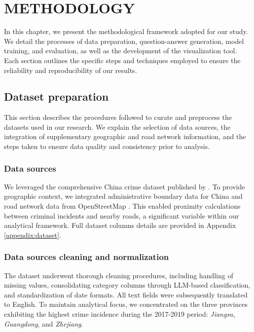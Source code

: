 \chapter{ METHODOLOGY}

\noindent
In this chapter, we present the methodological framework adopted for our study. We detail the processes of data preparation, question-answer generation, model training, and evaluation, as well as the development of the visualization tool. Each section outlines the specific steps and techniques employed to ensure the reliability and reproducibility of our results.

\section{Dataset preparation}

\noindent
This section describes the procedures followed to curate and preprocess the datasets used in our research. We explain the selection of data sources, the integration of supplementary geographic and road network information, and the steps taken to ensure data quality and consistency prior to analysis.

\subsection{Data sources}

We leveraged the comprehensive China crime dataset published by \cite{Zhang2025CrimeDatasetChina}. To provide geographic context, we integrated administrative boundary data for China \cite{GeoJSON2025China} and road network data from OpenStreetMap \cite{Vargas2021OSM}. This enabled proximity calculations between criminal incidents and nearby roads, a significant variable within our analytical framework. Full dataset columns details are provided in Appendix \ref{appendix:dataset}.

\subsection{Data sources cleaning and normalization}

The dataset underwent thorough cleaning procedures, including handling of missing values, consolidating category columns through LLM-based classification, and standardization of date formats. All text fields were subsequently translated to English. To maintain analytical focus, we concentrated on the three provinces exhibiting the highest crime incidence during the 2017-2019 period: \textit{Jiangsu}, \textit{Guangdong}, and \textit{Zhejiang}.

